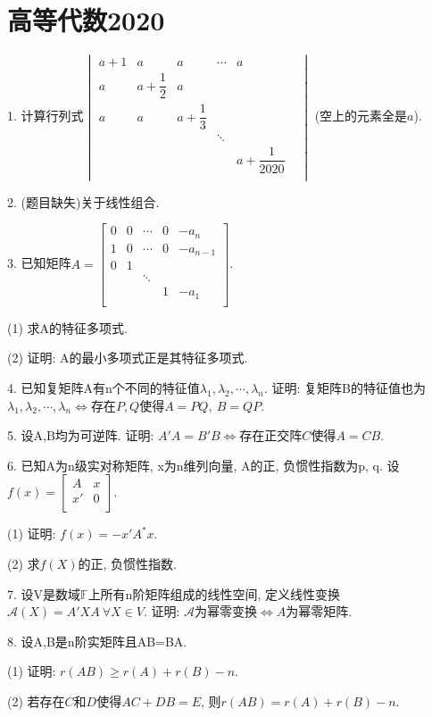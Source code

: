 \documentclass[12pt, a4paper, twoside]{ctexart}%
\begin{document}
	\section{高等代数2020}
	1. 计算行列式$\begin{vmatrix}
		a+1&a&a&\cdots& a\\
		a&a+\dfrac{1}{2}&a& & &\\
		a&a&a+\dfrac{1}{3}& & \\
		 & & &\ddots& \\
		 & & & & a+\dfrac{1}{2020}\\
	\end{vmatrix}$ (空上的元素全是$a$).\par 
	2. (题目缺失)关于线性组合. \par
	3. 已知矩阵$A=\begin{bmatrix}
	0&0&\cdots&0&-a_n \\
	1&0&\cdots&0&-a_{n-1}\\
	0&1& & & \\
	 & &\ddots& & \\
	 & & &1&-a_1\\
	\end{bmatrix}$.\par 
	\hspace{1.2em}(1) 求A的特征多项式.\par
	\hspace{1.2em}(2) 证明: A的最小多项式正是其特征多项式.\par
	4. 已知复矩阵A有n个不同的特征值$\lambda_1,\lambda_2,\cdots,\lambda_n$. 证明: 复矩阵B的特征值也为$\lambda_1,\lambda_2,\cdots,\lambda_n\iff$存在$P,Q$使得$A=PQ,\ B=QP$.\par 
	5. 设A,B均为可逆阵. 证明: $A'A=B'B\iff$存在正交阵$C$使得$A=CB$.\par
	6. 已知A为n级实对称矩阵, x为n维列向量, A的正, 负惯性指数为p, q. 设$f(x)=\begin{bmatrix}
		A&x\\
		x'&0\\
	\end{bmatrix}$.\par 
	\hspace{1.2em}(1) 证明: $f(x)=-x'A^*x$.\par 
	\hspace{1.2em}(2) 求$f(X)$的正, 负惯性指数. \par
	7. 设V是数域$\mathbb{F}$上所有n阶矩阵组成的线性空间, 定义线性变换$\mathscr{A}(X)=A'XA\ \forall X\in V$. 证明: $\mathscr{A}$为幂零变换$\iff A$为幂零矩阵.\par
	8. 设A,B是n阶实矩阵且AB=BA. \par
	\hspace{1.2em}(1) 证明: $r(AB)\ge r(A)+r(B)-n$.\par 
	\hspace{1.2em}(2) 若存在$C$和$D$使得$AC+DB=E$, 则$r(AB)=r(A)+r(B)-n$.\par 
	
\end{document}
